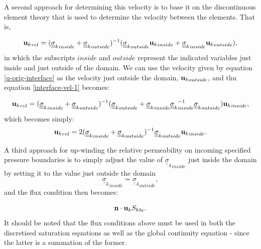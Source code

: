 A second approach for determining this velocity is to base it on the discontinuous element theory 
that is used to determine the velocity between the elements. That is,

\begin{equation}
{{\bf u}_k}_{rel}=   
({{\underline {\underline \sigma}}_k}_{inside}+{{\underline {\underline \sigma}}_k}_{outside})^{-1}
 (   {{\underline {\underline \sigma}}_k}_{outside} {{\bf u}_k}_{inside} 
+{{\underline {\underline \sigma}}_k}_{inside} {{\bf u}_k}_{outside}    ), 
\label{interface-vel-1}
\end{equation}
in which the subscripts $inside$ and $outside$ represent the indicated variables just inside 
and just outside of the domain. We can use the velocity given by equation \ref{u-orig-interface} 
as the velocity just outside the domain, ${{\bf u}_k}_{outside}$, and thu equation \ref{interface-vel-1} 
becomes: 

\begin{equation}
{{\bf u}_k}_{rel}=   
({{\underline {\underline \sigma}}_k}_{inside}+{{\underline {\underline \sigma}}_k}_{outside})^{-1}
 (   {{\underline {\underline \sigma}}_k}_{outside}  
+{{\underline {\underline \sigma}}_k}_{inside}   {{\underline {\underline \sigma}}_k}_{inside}^{-1} 
{{\underline {\underline \sigma}}_k}_{outside}  ){{\bf u}_k}_{inside},
\label{interface-vel-2}
\end{equation}
which becomes simply: 
\begin{equation}
{{\bf u}_k}_{rel}=   2
({{\underline {\underline \sigma}}_k}_{inside}+{{\underline {\underline \sigma}}_k}_{outside})^{-1}
{{\underline {\underline \sigma}}_k}_{outside}   {{\bf u}_k}_{inside}. 
\label{interface-vel-3}
\end{equation}

A third approach for up-winding the 
relative permeability on incoming specified pressure 
boundaries is to simply adjust the value of ${{\underline {\underline \sigma}}_k}_{inside}$ 
just inside the domain by setting it to the 
value just outside the domain 
\begin{equation}
{{\underline {\underline \sigma}}_k}_{inside}={{\underline {\underline \sigma}}_k}_{outside} ,
\end{equation}
and the flux 
condition then becomes: 


\begin{equation}
{\bf n}\cdot{{\bf u}_k} {S_k}_{bc}.
\end{equation}
It should be noted that the flux conditions above 
must be used in both the discretised saturation equations 
as well as the global continuity equation - since the latter 
is a summation of the former. 

